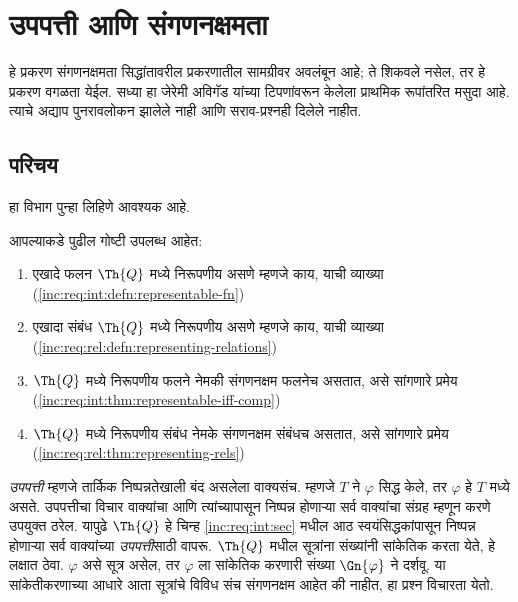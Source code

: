 \chapter{उपपत्ती आणि संगणनक्षमता}\label{inc:tcp:chap}
\begin{editorial}
  हे प्रकरण संगणनक्षमता सिद्धांतावरील प्रकरणातील सामग्रीवर
  अवलंबून आहे; ते शिकवले नसेल, तर हे प्रकरण वगळता येईल.
  सध्या हा जेरेमी अविगॅड यांच्या टिपणांवरून केलेला प्राथमिक
  रूपांतरित मसुदा आहे. त्याचे अद्याप पुनरावलोकन झालेले नाही
  आणि सराव-प्रश्नही दिलेले नाहीत.
\end{editorial}









\section{परिचय}\label{inc:tcp:int:sec}

\begin{editorial}
हा विभाग पुन्हा लिहिणे आवश्यक आहे.
\end{editorial}

आपल्याकडे पुढील गोष्टी उपलब्ध आहेत:
\begin{enumerate}
\item एखादे फलन $\Th{Q}$ मध्ये निरूपणीय असणे म्हणजे काय,
  याची व्याख्या (\ref{inc:req:int:defn:representable-fn})
\item एखादा संबंध $\Th{Q}$ मध्ये निरूपणीय असणे म्हणजे काय,
  याची व्याख्या (\ref{inc:req:rel:defn:representing-relations})
\item $\Th{Q}$ मध्ये निरूपणीय फलने नेमकी संगणनक्षम
  फलनेच असतात, असे सांगणारे प्रमेय
  (\ref{inc:req:int:thm:representable-iff-comp})
\item $\Th{Q}$ मध्ये निरूपणीय संबंध नेमके संगणनक्षम
  संबंधच असतात, असे सांगणारे प्रमेय
  (\ref{inc:req:rel:thm:representing-rels})
\end{enumerate}

{ \em उपपत्ती} म्हणजे तार्किक निष्पन्नतेखाली बंद असलेला वाक्यसंच.
म्हणजे $T$ ने $\varphi$ सिद्ध केले, तर $\varphi$ हे $T$ मध्ये
असते. उपपत्तीचा विचार वाक्यांचा आणि त्यांच्यापासून
निष्पन्न होणाऱ्या सर्व वाक्यांचा संग्रह म्हणून करणे
उपयुक्त ठरेल. यापुढे $\Th{Q}$ हे चिन्ह
\ref{inc:req:int:sec} मधील आठ स्वयंसिद्धकांपासून
निष्पन्न होणाऱ्या सर्व वाक्यांच्या { \em उपपत्ती}साठी
वापरू. $\Th{Q}$ मधील सूत्रांना संख्यांनी
सांकेतिक करता येते, हे लक्षात ठेवा. $\varphi$ असे
सूत्र असेल, तर $\varphi$ ला सांकेतिक करणारी
संख्या $\Gn{\varphi}$ ने दर्शवू. या सांकेतीकरणाच्या
आधारे आता सूत्रांचे विविध संच संगणनक्षम आहेत की
नाहीत, हा प्रश्न विचारता येतो.












